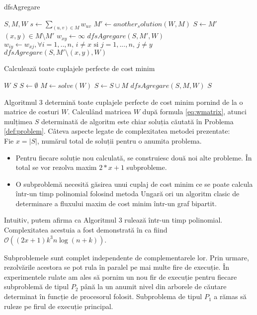 \begin{algorithm}
\caption{dfsAgregare}
\begin{algorithmic}[1]
\REQUIRE $S, M, W$
  \STATE $s \gets \sum_{(u, v) \in M} w_{uv}$
  \STATE $M' \gets another_solution(W, M)$
    \RETURN
  \ELSE
    \STATE $S \gets M'$
    \STATE $(x, y) \in M \setminus M'$
    \STATE $w_{xy} \gets \infty$
    \STATE $dfsAgregare(S, M', W)$
    \STATE $w_{iy} \gets w_{xj}, \forall i = 1,..,n \text{, }i \neq x  \text{ si } j = 1,...,n \text{, }j \neq y$
    \STATE $dfsAgregare(S, M' \setminus (x, y), W)$
  \ENDIF
\end{algorithmic}
\end{algorithm}

\begin{algorithm}
\caption{Calculează toate cuplajele perfecte de cost minim}
\begin{algorithmic}[1]
\REQUIRE $W$
\ENSURE $S$
  \STATE $S \gets \emptyset$
  \STATE $M \gets solve(W)$
  \STATE $S \gets S \cup M$
  \STATE $dfsAgregare(S, M, W)$
  \RETURN $S$
\end{algorithmic}
\end{algorithm}

Algoritmul 3 determină toate cuplajele perfecte de cost minim pornind de la o matrice de costuri
$W$. Calculând matricea $W$ după formula \eqref{eq:wmatrix}, atunci mulțimea $S$ determinată de
algoritm este chiar soluția căutată în Problema \ref{def:problem}. Câteva aspecte legate de
complexitatea metodei prezentate: \\
Fie $x = |S|$, numărul total de soluții pentru o anumita problema.
\begin{itemize}
  \item Pentru fiecare soluție nou calculată, se construiesc două noi alte probleme. În total se vor
    rezolva maxim $2*x+1$ subprobleme.
  \item O subproblemă necesită găsirea unui cuplaj de cost minim ce se poate calcula într-un timp
    polinomial folosind metoda Ungară\cite{hungarianmethod} ori un algoritm clasic de determinare
    a fluxului maxim de cost minim într-un graf bipartit\cite{flowassignment}.
\end{itemize}
Intuitiv, putem afirma ca Algoritmul 3 rulează într-un timp polinomial. Complexitatea acestuia a
fost demonstrată în \cite{allmatchings} ca fiind $\mathcal{O}((2x+1)k^3n\log(n+k))$.

Subproblemele sunt complet independente de complementarele lor. Prin urmare, rezolvările acestora se
pot rula în paralel pe mai multe fire de execuție. În experimentele rulate am ales să pornim
un nou fir de execuție pentru fiecare subproblemă de tipul $P_2$ până la un anumit nivel din
arborele de căutare determinat în funcție de procesorul folosit. Subproblema de tipul $P_1$
a rămas să ruleze pe firul de execuție principal.


